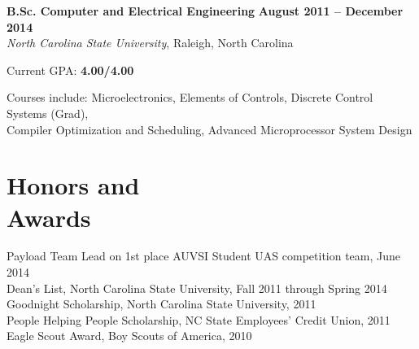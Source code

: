 \documentclass[margin,line,letterpaper]{resume}
\begin{document}
\begin{resume}
    \textbf{B.Sc. Computer and Electrical Engineering} \hfill \textbf{August 2011 -- December 2014} \vspace{1mm}\\\vspace{1mm}%
    \textsl{North Carolina State University}, Raleigh, North Carolina\vspace{-3mm}\\\vspace{-1mm}%
    \begin{list2}
        \item Current GPA: \textbf{4.00/4.00}
        \item Courses include: Microelectronics, Elements of Controls,
            Discrete Control Systems (Grad), \\ %
            Compiler Optimization and Scheduling, Advanced Microprocessor System Design
    \end{list2}


    \section{\mysidestyle Honors and\\Awards}

    Payload Team Lead on 1st place AUVSI Student UAS competition team, June 2014 \vspace{-8mm}\\

    Dean's List, North Carolina State University, Fall 2011 through Spring 2014 \vspace{-8mm}\\%

    Goodnight Scholarship, North Carolina State University, 2011              \vspace{-8mm}\\%

    People Helping People Scholarship, NC State Employees' Credit Union, 2011 \vspace{-8mm}\\%

    Eagle Scout Award, Boy Scouts of America, 2010


\end{resume}
\end{document}
